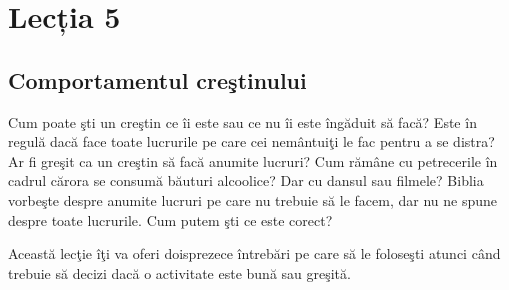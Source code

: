 \newpage

\section*{Lecția 5}

\subsection*{Comportamentul creştinului}

Cum poate şti un creştin ce îi este sau ce nu îi este îngăduit să facă? Este în regulă dacă face toate lucrurile pe care cei nemântuiţi le fac pentru a se distra? Ar fi greşit ca un creştin să facă anumite lucruri? Cum rămâne cu petrecerile în cadrul cărora se consumă băuturi alcoolice? Dar cu dansul sau filmele? Biblia vorbeşte despre anumite lucruri pe care nu trebuie să le facem, dar nu ne spune despre toate lucrurile. Cum putem şti ce este corect?

Această lecţie îţi va oferi doisprezece întrebări pe care să le foloseşti atunci când trebuie să decizi dacă  o activitate este bună sau greşită.

